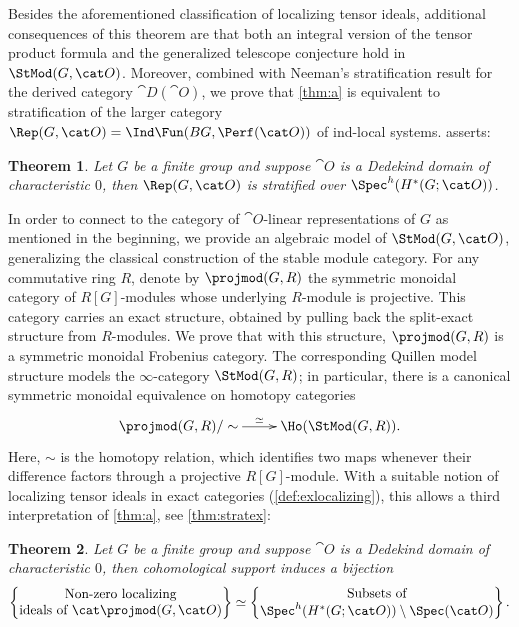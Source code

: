 \documentclass{amsart}%
\numberwithin{equation}{section}%
\newtheorem{thmx}{Theorem}
\theoremstyle{remark}
\begin{document}
Besides the aforementioned classification of localizing tensor ideals, additional consequences of this theorem are that both an integral version of the tensor product formula and the generalized telescope conjecture hold in $\StMod(G,\cat O)$. Moreover, combined with Neeman's stratification result \cite{Neeman92a} for the derived category $\cat D(\cat O)$, we prove that \cref{thm:a} is equivalent to stratification of the larger category $\Rep(G,\cat O) = \Ind\Fun(BG,\Perf(\cat O))$ of ind-local systems.  asserts:

\begin{thmx}\label{thm:b}
Let $G$ be a finite group and suppose $\cat O$ is a Dedekind domain of characteristic $0$, then $\Rep(G,\cat O)$ is stratified over $\Spec^h(H^*(G;\cat O))$.
\end{thmx}

In order to connect to the category of $\cat O$-linear representations of $G$ as mentioned in the beginning, we provide an algebraic model of $\StMod(G,\cat O)$, generalizing the classical construction of the stable module category. For any commutative ring $R$, denote by $\projmod(G,R)$ the symmetric monoidal category of $R[G]$-modules whose underlying $R$-module is projective. This category carries an exact structure, obtained by pulling back the split-exact structure from $R$-modules. We prove that with this structure, $\projmod(G,R)$ is a symmetric monoidal Frobenius category. The corresponding Quillen model structure models the $\infty$-category $\StMod(G,R)$; in particular, there is a canonical symmetric monoidal equivalence on homotopy categories
\[
\xymatrix{\projmod(G,R)/\sim \ar[r]^-{\simeq} & \Ho(\StMod(G,R)).}
\]
Here, $\sim$ is the homotopy relation, which identifies two maps whenever their difference factors through a projective $R[G]$-module. With a suitable notion of localizing tensor ideals in exact categories (\cref{def:exlocalizing}), this allows a third interpretation of \cref{thm:a}, see \cref{thm:stratex}:

\begin{thmx}\label{thm:c}%
Let $G$ be a finite group and suppose $\cat O$ is a Dedekind domain of characteristic $0$, then cohomological support induces a bijection
\[
\begin{Bmatrix}
\text{Non-zero localizing} \\
\text{ideals of } \cat \projmod(G,\cat O)
\end{Bmatrix} 
\simeq
\begin{Bmatrix}
\text{Subsets of} \\
\Spec^h(H^*(G;\cat O))\setminus\Spec(\cat O)
\end{Bmatrix}.
\]
\end{thmx}
\end{document}

